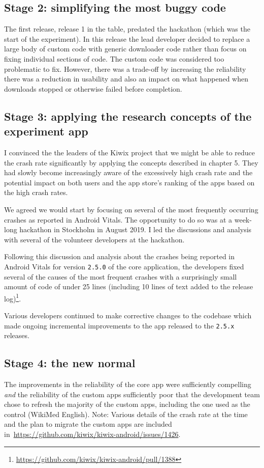 \subsection{Stage 2: simplifying the most buggy code}
The first release, release 1 in the table, predated the hackathon (which was the start of the experiment). In this release the lead developer decided to replace a large body of custom code with generic downloader code rather than focus on fixing individual sections of code. The custom code was considered too problematic to fix. However, there was a trade-off by increasing the reliability there was a reduction in usability and also an impact on what happened when downloads stopped or otherwise failed before completion.

\subsection{Stage 3: applying the research concepts of the experiment app}
I convinced the the leaders of the Kiwix project that we might be able to reduce the crash rate significantly by applying the concepts described in chapter 5. They had slowly become increasingly aware of the excessively high crash rate and the potential impact on both users and the app store's ranking of the apps based on the high crash rates. 

We agreed we would start by focusing on several of the most frequently occurring crashes as reported in Android Vitals. The opportunity to do so was at a week-long hackathon in Stockholm in August 2019. I led the discussions and analysis with several of the volunteer developers at the hackathon. 

Following this discussion and analysis about the crashes being reported in Android Vitals for version \texttt{2.5.0} of the core application, the developers fixed several of the causes of the most frequent crashes with a surprisingly small amount of code of under 25 lines (including 10 lines of text added to the release log)\footnote{\url{https://github.com/kiwix/kiwix-android/pull/1388}}.

Various developers continued to make corrective changes to the codebase which made ongoing incremental improvements to the app released to the \texttt{2.5.x} releases. 

\subsection{Stage 4: the new normal}
The improvements in the reliability of the core app were sufficiently compelling \emph{and} the reliability of the custom apps sufficiently poor that the development team chose to refresh the majority of the custom apps, including the one used as the control (WikiMed English). Note: Various details of the crash rate at the time and the plan to migrate the custom apps are included in~\url{https://github.com/kiwix/kiwix-android/issues/1426}. 


